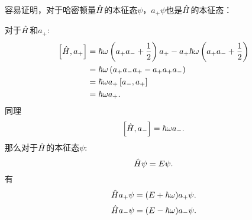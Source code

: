 容易证明，对于哈密顿量$\hat{H}$的本征态$\psi$，$a_+\psi$也是$\hat{H}$的本征态：
\begin{graybox}[Proof]
对于$\hat{H}$和$a_+$:
\begin{equation}
    \begin{aligned}
        \left[\hat{H},a_+\right]&=\hbar\omega\left(a_+a_-+\frac{1}{2}\right)a_+-a_+\hbar\omega\left(a_+a_-+\frac{1}{2}\right)\\
        &=\hbar\omega\left(a_+a_-a_+-a_+a_+a_-\right)\\
        &=\hbar\omega a_+\left[a_-,a_+\right]\\
        &=\hbar\omega a_+.
    \end{aligned}
\end{equation}
同理
\begin{equation}
    \left[\hat{H},a_-\right]=\hbar\omega a_-.
\end{equation}
那么对于$\hat{H}$的本征态$\psi$:
\begin{equation}
    \hat{H}\psi=E\psi.
\end{equation}
有 
\begin{equation}
    \hat{H}a_+\psi=(E+\hbar\omega)a_+\psi.
\end{equation}
\begin{equation}
    \hat{H}a_-\psi=(E-\hbar\omega)a_-\psi.
\end{equation}
\end{graybox}


